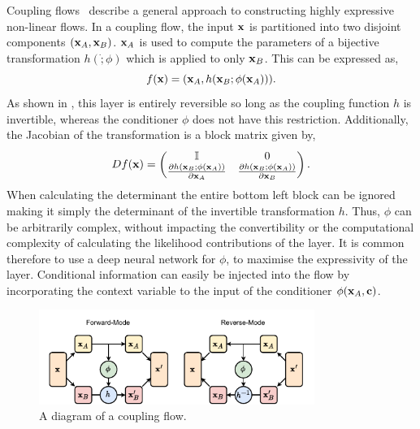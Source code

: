 Coupling flows~\cite{NICENonlinearIndependent} describe a general approach to constructing highly expressive non-linear flows.
In a coupling flow, the input $\mathbf{x}$ is partitioned into two disjoint components $(\mathbf{x}_A, \mathbf{x}_B)$.
$\mathbf{x}_A$ is used to compute the parameters of a bijective transformation $h(\dot; \phi)$ which is applied to only $\mathbf{x}_B$.
This can be expressed as,
\begin{equation}
    \label{eq:coupling_flow}
    f(\mathbf{x}) = (\mathbf{x}_A, h(\mathbf{x}_B; \phi(\mathbf{x}_A))).
\end{equation}
As shown in , this layer is entirely reversible so long as the coupling function $h$ is invertible, whereas the conditioner $\phi$ does not have this restriction.
Additionally, the Jacobian of the transformation is a block matrix given by,
\begin{equation}
    D f(\mathbf{x}) = \begin{pmatrix}
        \mathbb{I} & 0 \\
        \frac{\partial h(\mathbf{x}_B; \phi(\mathbf{x}_A))}{\partial \mathbf{x}_A} & \frac{\partial h(\mathbf{x}_B; \phi(\mathbf{x}_A))}{\partial \mathbf{x}_B}
    \end{pmatrix}.
\end{equation}
When calculating the determinant the entire bottom left block can be ignored making it simply the determinant of the invertible transformation $h$.
Thus, $\phi$ can be arbitrarily complex, without impacting the convertibility or the computational complexity of calculating the likelihood contributions of the layer.
It is common therefore to use a deep neural network for $\phi$, to maximise the expressivity of the layer.
Conditional information can easily be injected into the flow by incorporating the context variable to the input of the conditioner $\phi(\mathbf{x}_A, \mathbf{c})$.

\begin{figure}[ht]
    \centering
    \includegraphics[width=0.8\textwidth]{Figures/transformers/coupling.pdf}
    \caption{A diagram of a coupling flow.}
    \label{fig:coupling_flow}
\end{figure}

